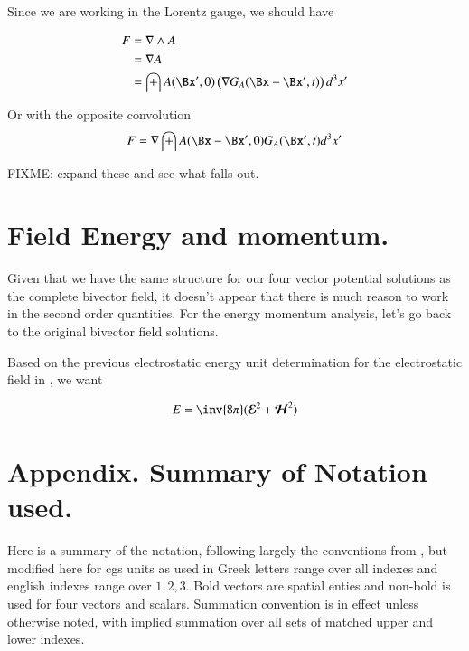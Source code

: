 \documentclass{article}
\newcommand{\EE}[0]{\boldsymbol{\mathcal{E}}}
\newcommand{\HH}[0]{\boldsymbol{\mathcal{H}}}
\begin{document}
Since we are working in the Lorentz gauge, we should have

\begin{align*}
F 
&= \grad \wedge A \\
&= \grad A \\
&= \int A(\Bx', 0) \left(\grad G_A(\Bx - \Bx', t) \right) d^3 x' \\
\end{align*}

Or with the opposite convolution
\begin{align*}
F &= \grad \int A(\Bx - \Bx', 0) G_A(\Bx', t) d^3 x' \\
\end{align*}

FIXME: expand these and see what falls out.  

\section{ Field Energy and momentum. }

Given that we have the same structure for our four vector potential solutions as the complete bivector field, it doesn't appear that there is much
reason to work in the second order quantities.  For the energy momentum analysis, let's go back to the original bivector field solutions.

Based on the previous electrostatic energy unit determination for the electrostatic field in 
\cite{PJrayleighJeans}, we want

\begin{align*}
E = \inv{8\pi} ({\EE}^2 + \HH^2)
\end{align*}


\section{ Appendix.  Summary of Notation used. }

% 
%
Here is a summary of the notation, following largely the conventions from
\cite{doran2003gap}, but modified here for cgs units as used in \cite{bohm1989qt}
Greek letters range over all indexes and
english indexes range over $1,2,3$.  Bold vectors are spatial enties and non-bold is used for four vectors and scalars.
Summation convention is in effect unless otherwise noted, with implied summation over all sets of matched upper and lower indexes.
\end{document}
